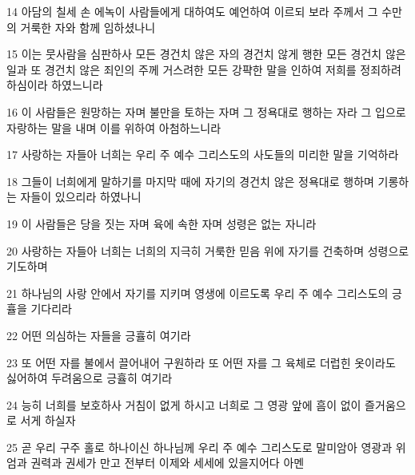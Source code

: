 \par 14 아담의 칠세 손 에녹이 사람들에게 대하여도 예언하여 이르되 보라 주께서 그 수만의 거룩한 자와 함께 임하셨나니
\par 15 이는 뭇사람을 심판하사 모든 경건치 않은 자의 경건치 않게 행한 모든 경건치 않은 일과 또 경건치 않은 죄인의 주께 거스려한 모든 강퍅한 말을 인하여 저희를 정죄하려 하심이라 하였느니라
\par 16 이 사람들은 원망하는 자며 불만을 토하는 자며 그 정욕대로 행하는 자라 그 입으로 자랑하는 말을 내며 이를 위하여 아첨하느니라
\par 17 사랑하는 자들아 너희는 우리 주 예수 그리스도의 사도들의 미리한 말을 기억하라
\par 18 그들이 너희에게 말하기를 마지막 때에 자기의 경건치 않은 정욕대로 행하며 기롱하는 자들이 있으리라 하였나니
\par 19 이 사람들은 당을 짓는 자며 육에 속한 자며 성령은 없는 자니라
\par 20 사랑하는 자들아 너희는 너희의 지극히 거룩한 믿음 위에 자기를 건축하며 성령으로 기도하며
\par 21 하나님의 사랑 안에서 자기를 지키며 영생에 이르도록 우리 주 예수 그리스도의 긍휼을 기다리라
\par 22 어떤 의심하는 자들을 긍휼히 여기라
\par 23 또 어떤 자를 불에서 끌어내어 구원하라 또 어떤 자를 그 육체로 더럽힌 옷이라도 싫어하여 두려움으로 긍휼히 여기라
\par 24 능히 너희를 보호하사 거침이 없게 하시고 너희로 그 영광 앞에 흠이 없이 즐거움으로 서게 하실자
\par 25 곧 우리 구주 홀로 하나이신 하나님께 우리 주 예수 그리스도로 말미암아 영광과 위엄과 권력과 권세가 만고 전부터 이제와 세세에 있을지어다 아멘


